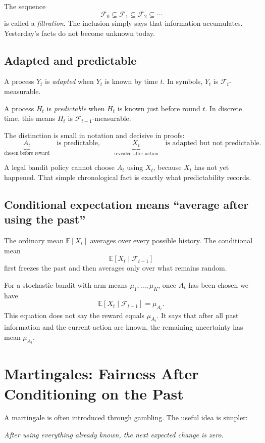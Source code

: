 \documentclass[en,nofont,11pt]{elegantbook}
\newcommand{\E}{\mathbb{E}}
\newcommand{\F}{\mathcal{F}}
\begin{document}
The sequence
\[
\F_0\subseteq \F_1\subseteq \F_2\subseteq\cdots
\]
is called a \emph{filtration}. The inclusion simply says that information accumulates. Yesterday's facts do not become unknown today.

\section{Adapted and predictable}

A process $Y_t$ is \emph{adapted} when $Y_t$ is known by time $t$. In symbols, $Y_t$ is $\F_t$-measurable.

A process $H_t$ is \emph{predictable} when $H_t$ is known just before round $t$. In discrete time, this means $H_t$ is $\F_{t-1}$-measurable.

The distinction is small in notation and decisive in proofs:
\[
\underbrace{A_t}_{\text{chosen before reward}}
\quad\text{is predictable,}
\qquad
\underbrace{X_t}_{\text{revealed after action}}
\quad\text{is adapted but not predictable.}
\]

A legal bandit policy cannot choose $A_t$ using $X_t$, because $X_t$ has not yet happened. That simple chronological fact is exactly what predictability records.

\section{Conditional expectation means ``average after using the past''}

The ordinary mean $\E[X_t]$ averages over every possible history. The conditional mean
\[
\E[X_t\mid \F_{t-1}]
\]
first freezes the past and then averages only over what remains random.

For a stochastic bandit with arm means $\mu_1,\ldots,\mu_K$, once $A_t$ has been chosen we have
\[
\E[X_t\mid \F_{t-1}]
=
\mu_{A_t}.
\]
This equation does not say the reward equals $\mu_{A_t}$. It says that after all past information and the current action are known, the remaining uncertainty has mean $\mu_{A_t}$.

\chapter{Martingales: Fairness After Conditioning on the Past}

A martingale is often introduced through gambling. The useful idea is simpler:

\begin{center}
\emph{After using everything already known, the next expected change is zero.}
\end{center}
\end{document}
